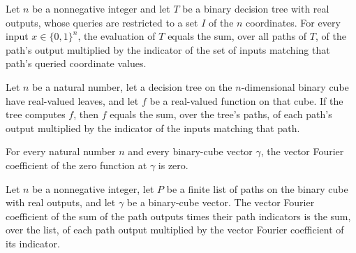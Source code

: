 \begin{theorem}
\leanok
{}
Let $n$ be a nonnegative integer and let $T$ be a binary decision tree with real
outputs, whose queries are restricted to a set $I$ of the $n$ coordinates. For every
input $x\in\{0,1\}^n$, the evaluation of $T$ equals the sum, over all paths of $T$, of
the path's output multiplied by the indicator of the set of inputs matching that path's
queried coordinate values.
\end{theorem}

\begin{theorem}
\leanok
{}
Let $n$ be a natural number, let a decision tree on the $n$-dimensional binary cube have
real-valued leaves, and let $f$ be a real-valued function on that cube. If the tree
computes $f$, then $f$ equals the sum, over the tree's paths, of each path's output
multiplied by the indicator of the inputs matching that path.
\end{theorem}

\begin{theorem}
\leanok
{}
For every natural number $n$ and every binary-cube vector $\gamma$, the vector Fourier
coefficient of the zero function at $\gamma$ is zero.
\end{theorem}

\begin{theorem}
\leanok
{}
Let $n$ be a nonnegative integer, let $P$ be a finite list of paths on the binary cube
with real outputs, and let $\gamma$ be a binary-cube vector. The vector Fourier
coefficient of the sum of the path outputs times their path indicators is the sum, over
the list, of each path output multiplied by the vector Fourier coefficient of its
indicator.
\end{theorem}

